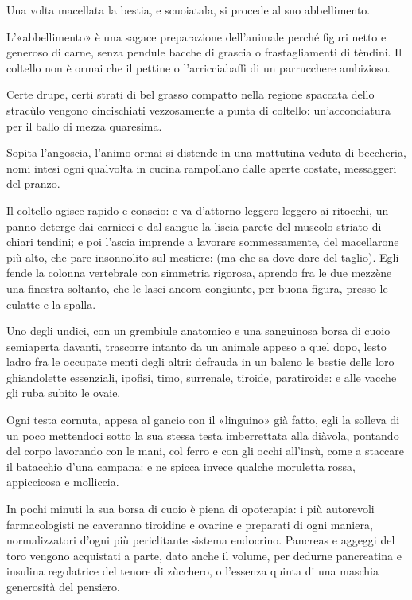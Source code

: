 Una volta macellata la bestia, e scuoiatala, si procede al suo abbellimento.

L’«abbellimento» è una sagace preparazione dell’animale perché figuri netto e generoso di carne, senza pendule bacche di grascia o frastagliamenti di tèndini. Il coltello non è ormai che il pettine o l’arricciabaffi di un parrucchere ambizioso.

Certe drupe, certi strati di bel grasso compatto nella regione spaccata dello stracùlo vengono cincischiati vezzosamente a punta di coltello: un’acconciatura per il ballo di mezza quaresima.

Sopita l’angoscia, l’animo ormai si distende in una mattutina veduta di beccheria, nomi intesi ogni qualvolta in cucina rampollano dalle aperte costate, messaggeri del pranzo.

Il coltello agisce rapido e conscio: e va d’attorno leggero leggero ai ritocchi, un panno deterge dai carnicci e dal sangue la liscia parete del muscolo striato di chiari tendini; e poi l’ascia imprende a lavorare sommessamente, del macellarone più alto, che pare insonnolito sul mestiere: (ma che sa dove dare del taglio). Egli fende la colonna vertebrale con simmetria rigorosa, aprendo fra le due mezzène una finestra soltanto, che le lasci ancora congiunte, per buona figura, presso le culatte e la spalla.

Uno degli undici, con un grembiule anatomico e una sanguinosa borsa di cuoio semiaperta davanti, trascorre intanto da un animale appeso a quel dopo, lesto ladro fra le occupate menti degli altri: defrauda in un baleno le bestie delle loro ghiandolette essenziali, ipofisi, timo, surrenale, tiroide, paratiroide: e alle vacche gli ruba subito le ovaie.

Ogni testa cornuta, appesa al gancio con il «linguino» già fatto, egli la solleva di un poco mettendoci sotto la sua stessa testa imberrettata alla diàvola, pontando del corpo lavorando con le mani, col ferro e con gli occhi all’insù, come a staccare il batacchio d’una campana: e ne spicca invece qualche moruletta rossa, appiccicosa e molliccia.

In pochi minuti la sua borsa di cuoio è piena di opoterapia: i più autorevoli farmacologisti ne caveranno tiroidine e ovarine e preparati di ogni maniera, normalizzatori d’ogni più periclitante sistema endocrino. Pancreas e aggeggi del toro vengono acquistati a parte, dato anche il volume, per dedurne pancreatina e insulina regolatrice del tenore di zùcchero, o l’essenza quinta di una maschia generosità del pensiero.

